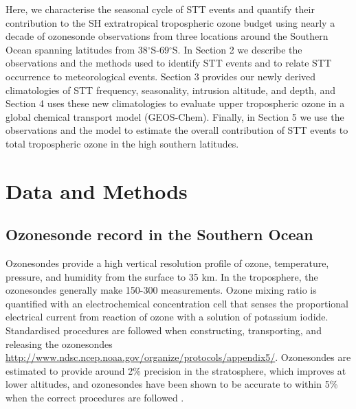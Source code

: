 \documentclass[acp, manuscript]{copernicus} %
\providecommand{\DIFaddbegin}{} %
\providecommand{\DIFaddend}{} %
\providecommand{\DIFdelbegin}{} %
\providecommand{\DIFdelend}{} %
\begin{document}
\DIFdelbegin %


\DIFdelend %
  Here, we characterise the seasonal cycle of STT events and quantify their contribution to the SH extratropical tropospheric ozone budget using nearly a decade of ozonesonde observations from three locations around the Southern Ocean spanning latitudes from 38$^{\circ}$S-69$^{\circ}$S. 
  In Section 2 we describe the observations and the methods used to identify STT events and to relate STT occurrence to meteorological events.
  Section 3 provides our newly derived climatologies of STT frequency, seasonality, intrusion altitude, and depth, and Section 4 uses these new climatologies to evaluate upper tropospheric ozone in a global chemical transport model (GEOS-Chem). 
  Finally, in Section 5 we use the observations and the model to estimate the overall contribution of STT events to total tropospheric ozone in the high southern latitudes.


%
\section{Data and Methods}
\DIFaddbegin 

  \DIFaddend \subsection{Ozonesonde record in the Southern Ocean}
  \label{Section:ozonesondes}
    Ozonesondes provide a high vertical resolution profile of ozone, temperature, pressure, and humidity from the surface to 35 km.
    In the troposphere, the ozonesondes generally make 150-300 measurements.    
    Ozone mixing ratio is quantified with an electrochemical concentration cell that senses the proportional electrical current from reaction of ozone with a solution of potassium iodide.
    Standardised procedures are followed when constructing, transporting, and releasing the ozonesondes \url{http://www.ndsc.ncep.noaa.gov/organize/protocols/appendix5/}.
    Ozonesondes are estimated to provide around 2\% precision in the stratosphere, which improves at lower altitudes, and ozonesondes have been shown to be accurate to within 5\% when the correct procedures are followed \citep{Smit2007}.
\end{document}
